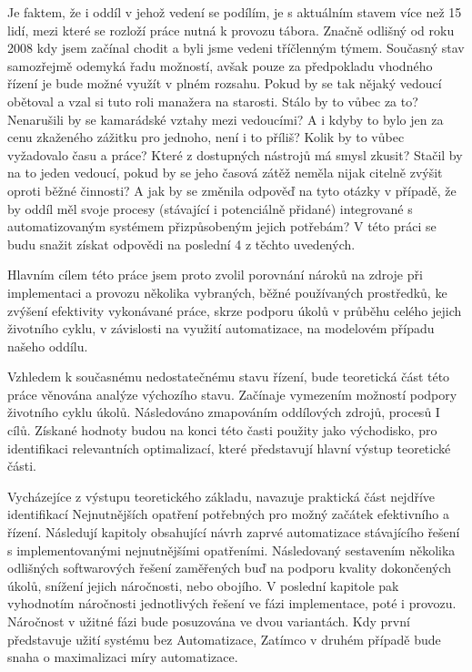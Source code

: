 Je faktem, že i oddíl v jehož vedení se podílím, je s aktuálním stavem více než 15 lidí, mezi které se rozloží práce nutná k provozu tábora. Značně odlišný od roku 2008 kdy jsem začínal chodit a byli jsme vedeni tříčlenným týmem. Současný stav samozřejmě odemyká řadu možností, avšak pouze za předpokladu vhodného řízení je bude možné využít v plném rozsahu. Pokud by se tak nějaký vedoucí obětoval a vzal si tuto roli manažera na starosti. Stálo by to vůbec za to? Nenarušili by se kamarádské vztahy mezi vedoucími? A i kdyby to bylo jen za cenu zkaženého zážitku pro jednoho, není i to příliš? Kolik by to vůbec vyžadovalo času a práce? Které z dostupných nástrojů má smysl zkusit? Stačil by na to jeden vedoucí, pokud by se jeho časová zátěž neměla nijak citelně zvýšit oproti běžné činnosti? A jak by se změnila odpověď na tyto otázky v případě, že by oddíl měl svoje procesy (stávající i potenciálně přidané) integrované s automatizovaným systémem přizpůsobeným jejich potřebám? V této práci se budu snažit získat odpovědi na poslední 4 z těchto uvedených. 

Hlavním cílem této práce jsem proto zvolil porovnání nároků na zdroje při implementaci a provozu několika vybraných, běžné používaných prostředků, ke zvýšení efektivity vykonávané práce, skrze podporu úkolů v průběhu celého jejich životního cyklu, v závislosti na využití automatizace, na modelovém případu našeho oddílu. 

Vzhledem k současnému nedostatečnému stavu řízení, bude teoretická část této práce věnována analýze výchozího stavu. Začínaje vymezením možností podpory životního cyklu úkolů. Následováno zmapováním oddílových zdrojů, procesů I cílů. Získané hodnoty budou na konci této časti použity jako východisko, pro identifikaci relevantních optimalizací, které představují hlavní výstup teoretické části. 

Vycházejíce z výstupu teoretického základu, navazuje praktická část nejdříve identifikací Nejnutnějších opatření potřebných pro možný začátek efektivního a řízení. Následují kapitoly obsahující návrh zaprvé automatizace stávajícího řešení s implementovanými nejnutnějšími opatřeními. Následovaný sestavením několika odlišných softwarových řešení zaměřených buď na podporu kvality dokončených úkolů, snížení jejich náročnosti, nebo obojího. V poslední kapitole pak vyhodnotím náročnosti jednotlivých řešení ve fázi implementace, poté i provozu. Náročnost v užitné fázi bude posuzována ve dvou variantách. Kdy první představuje užití systému bez Automatizace, Zatímco v druhém případě bude snaha o maximalizaci míry automatizace. 
